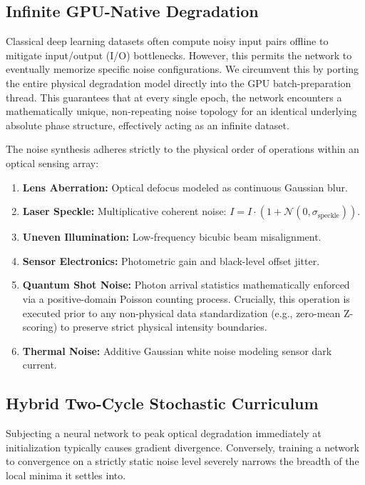 \documentclass[11pt,onecolumn]{IEEEtran}
\begin{document}
\subsection{Infinite GPU-Native Degradation}
Classical deep learning datasets often compute noisy input pairs offline to mitigate input/output (I/O) bottlenecks. However, this permits the network to eventually memorize specific noise configurations. We circumvent this by porting the entire physical degradation model directly into the GPU batch-preparation thread. This guarantees that at every single epoch, the network encounters a mathematically unique, non-repeating noise topology for an identical underlying absolute phase structure, effectively acting as an infinite dataset.

The noise synthesis adheres strictly to the physical order of operations within an optical sensing array:
\begin{enumerate}
  \item \textbf{Lens Aberration:} Optical defocus modeled as continuous Gaussian blur.
  \item \textbf{Laser Speckle:} Multiplicative coherent noise: $I = I \cdot (1 + \mathcal{N}(0, \sigma_{\text{speckle}}))$.
  \item \textbf{Uneven Illumination:} Low-frequency bicubic beam misalignment.
  \item \textbf{Sensor Electronics:} Photometric gain and black-level offset jitter.
  \item \textbf{Quantum Shot Noise:} Photon arrival statistics mathematically enforced via a positive-domain Poisson counting process. Crucially, this operation is executed prior to any non-physical data standardization (e.g., zero-mean Z-scoring) to preserve strict physical intensity boundaries.
  \item \textbf{Thermal Noise:} Additive Gaussian white noise modeling sensor dark current.
\end{enumerate}

\subsection{Hybrid Two-Cycle Stochastic Curriculum}
Subjecting a neural network to peak optical degradation immediately at initialization typically causes gradient divergence. Conversely, training a network to convergence on a strictly static noise level severely narrows the breadth of the local minima it settles into.
\end{document}

